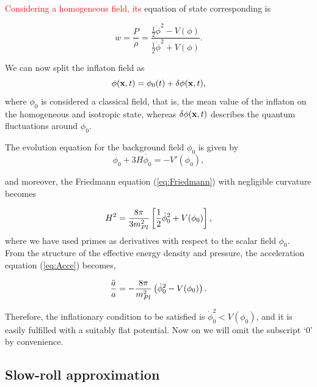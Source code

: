 \documentclass{rmaa}
\def\beq{\begin{equation}}
\def\eeq{\end{equation}}
\begin{document}
\noindent
\textcolor{red}{Considering a homogeneous field, its} equation of state corresponding is
 
\begin{equation}
w = \frac{P}{\rho}=\frac{\frac{1}{2}\dot \phi^2-V(\phi)}{\frac{1}{2}\dot \phi^2+V(\phi)}.
\end{equation}

\noindent
We can now split the inflaton field as
\beq \label{eq:split}
\phi({\bf x},t)=\phi_{0}(t)+\delta\phi({\bf x},t),
\eeq
where $\phi_{0}$ is considered a classical field, that is, 
the mean value of the inflaton on the homogeneous and isotropic state, 
whereas $\delta\phi({\bf x},t)$ describes the quantum fluctuations around $\phi_{0}$.

\noindent
The evolution equation for the background field $\phi_0$  is given by
\begin{equation}
\ddot{\phi_0}+ 3H\dot{\phi_0}= -V'(\phi_0),
\label{eq:motion1}
\end{equation}

\noindent
and moreover, the Friedmann equation (\ref{eq:Friedmann}) with negligible curvature becomes

\beq \label{eq:motion2}
H^2 = \frac{8\pi}{3m^2_{Pl}} \left[{1 \over 2} \dot\phi_0^2 +V(\phi_0)\right],
\eeq
where we have used 
primes as derivatives with respect to the scalar field $\phi_0$. 
\\

 From the structure of the effective energy density and pressure, the acceleration
  equation (\ref{eq:Acce}) becomes, 
 
 \beq
 {\ddot a \over a} = -{8\pi \over m_{Pl}^2}\left(\dot \phi_0^2-V(\phi_0) \right).
 \eeq
 
 \noindent
 Therefore, the inflationary condition to be satisfied is $\dot \phi_0^2 < V(\phi_0)$, and 
 it is easily fulfilled with a suitably flat potential. Now on we will omit the subscript
 `0' by convenience.



\subsection{Slow-roll approximation}
\vskip 6pt
\end{document}
